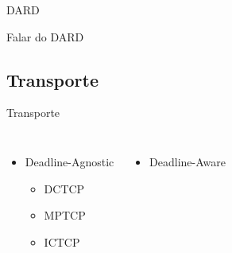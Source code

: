 \documentclass[aspectratio=169]{beamer}
\begin{document}
    
    
 
    \begin{frame} {DARD}
      				
   
	  Falar do DARD
	        
                
    \end{frame}     
    
    
    \subsection{Transporte}
	\begin{frame} {Transporte}
	      				
           \begin{columns}[t]    
                 	
             
             \begin{itemize}
              
             \setlength\itemsep{2em}
                \large
                \item
                   Deadline-Agnostic
                    
                \begin{itemize}
                    
                    \item
                          DCTCP
                
                    \item
                           MPTCP
                
                     \item
                        ICTCP 
                                
                \end{itemize}
                        
             \end{itemize}
              
         
             
             \begin{itemize}
              
             \setlength\itemsep{2em}
                \large
                \item
                   Deadline-Aware
                    
                \begin{itemize}
                    

\end{itemize}
\end{itemize}
\end{columns}
\end{frame}
\end{document}
